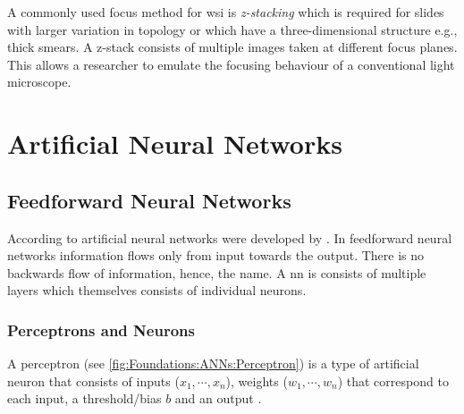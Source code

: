 A commonly used focus method for \ac{wsi} is \emph{z-stacking} \cite{el-gabry2014wholeslide} which is required for slides with larger variation in topology or which have a three-dimensional structure e.g., thick smears. A z-stack consists of multiple images taken at different focus planes. This allows a researcher to emulate the focusing behaviour of a conventional light microscope. 

\section{Artificial Neural Networks}
\label{sec:Foundations:NeuralNetworks}


\subsection{Feedforward Neural Networks}
\label{sec:Foundations:NeuralNetworks:FNN}

According to \textcite{nielsen2015neural} artificial neural networks were developed by \textcite{rosenblatt1958perceptron}. In feedforward neural networks information flows only from input towards the output. There is no backwards flow of information, hence, the name.
A \ac{nn} is consists of multiple layers which themselves consists of individual neurons.

\subsubsection{Perceptrons and Neurons}
\label{sec:Foundations:NeuralNetworks:Perceptrons}

A perceptron (see \autoref{fig:Foundations:ANNs:Perceptron}) is a type of artificial neuron that consists of inputs ($x_1, \cdots, x_n$), weights ($w_1, \cdots, w_n$) that correspond to each input, a threshold/bias $b$ and an output \cite{nielsen2015neural}.


